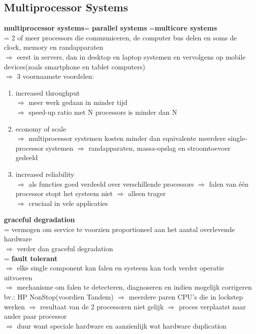 \documentclass{report}
\begin{document}
\subsection{Multiprocessor Systems}
\textbf{multiprocessor systems}= \textbf{parallel systems} =\textbf{multicore systems}
\\= 2 of meer processors die communiceren, de computer bus delen en soms de clock, memory en randapparaten
\\$\Rightarrow$ eerst in servers, dan in desktop en laptop systemen en vervolgens op mobile devices(zoals smartphone en tablet computers)
\\$\Rightarrow$ 3 voornaamste voordelen:
\begin{enumerate}
\item increased throughput
\\$\Rightarrow$ meer werk gedaan in minder tijd
\\$\Rightarrow$ speed-up ratio met N processors is minder dan N
\item economy of scale
\\$\Rightarrow$ multiprocessor systemen kosten minder dan equivalente meerdere single-processor systemen $\Rightarrow$ randapparaten, massa-opslag en stroomtoevoer gedeeld 
\item increased reliability
\\$\Rightarrow$ als functies goed verdeeld over verschillende processors $\Rightarrow$ falen van \'e\'en processor stopt het systeem niet $\Rightarrow$ alleen trager
\\$\Rightarrow$ cruciaal in vele applicaties
\end{enumerate}
\textbf{graceful degradation}
\\= vermogen om service te voorzien proportioneel aan het aantal overlevende hardware
\\$\Rightarrow$ verder dan graceful degradation 
\\= \textbf{fault tolerant}
\\$\Rightarrow$ elke single component kan falen en systeem kan toch verder operatie uitvoeren
\\$\Rightarrow$ mechanisme om falen te detecteren, diagnoseren en indien mogelijk corrigeren
\\bv.: HP NonStop(voordien Tandem) $\Rightarrow$ meerdere paren CPU's die in lockstep werken $\Rightarrow$ resultaat van de 2 processoren niet gelijk $\Rightarrow$ proces verplaatst naar ander paar processor 
\\ $\Rightarrow$ duur want speciale hardware en aanzienlijk wat hardware duplication
\end{document}
